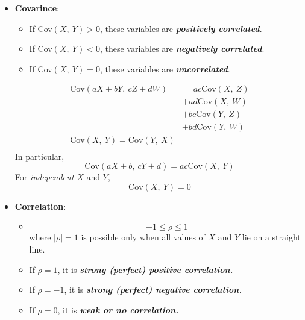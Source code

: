 \begin{multicols}{2}
\begin{itemize}
  \item \textbf{Covarince}:
      \begin{itemize}
        \item If Cov$(X,\ Y) > 0$, these variables are \textit{\textbf{positively correlated}}.
        
        \item If Cov$(X,\ Y) < 0$, these variables are \textit{\textbf{negatively correlated}}.

        \item If Cov$(X,\ Y) = 0$, these variables are \textit{\textbf{uncorrelated}}.
      \end{itemize}

      \begin{align*}
        \text{Cov}(aX + bY,\ cZ + dW) &= ac\text{Cov}(X,\ Z)\\
                                         &+ ad\text{Cov}(X,\ W)\\
                                         &+ bc\text{Cov}(Y,\ Z)\\
                                         &+ bd\text{Cov}(Y,\ W)\\
        \text{Cov}(X,\ Y) = \text{Cov}(Y,\ X)\\
      \end{align*}
      In particular,
      \begin{equation*}
        \text{Cov}(aX + b,\ cY + d) = ac\text{Cov}(X,\ Y)
      \end{equation*}
      For \textit{independent} $X$ and $Y$,
      \begin{equation*}
        \text{Cov}(X,\ Y) = 0
      \end{equation*}

\end{itemize}
\vfill\null
\columnbreak
\begin{itemize}
    \item \textbf{Correlation}:
      \begin{itemize}
        \item \begin{equation*}
          -1 \leq \rho \leq 1
        \end{equation*}
        where $|\rho| = 1$ is possible only when all values of $X$ and $Y$ lie on a straight line.
        
        \item If $\rho = 1$, it is \textit{\textbf{strong (perfect) positive correlation.}}
        \item If $\rho = -1$, it is \textit{\textbf{strong (perfect) negative correlation.}}
        \item If $\rho = 0$, it is \textit{\textbf{weak or no correlation.}}
      \end{itemize}


\end{itemize}
\end{multicols}
